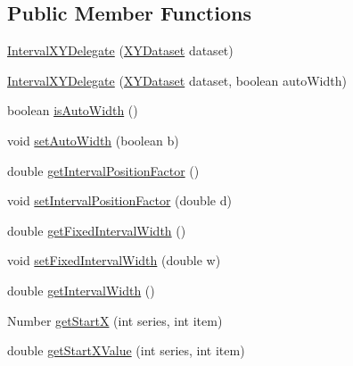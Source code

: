 \subsection*{Public Member Functions}
\begin{DoxyCompactItemize}
\item 
\mbox{\hyperlink{classorg_1_1jfree_1_1data_1_1xy_1_1_interval_x_y_delegate_a613e04f9c0fae1009e4b7c78223815d4}{Interval\+X\+Y\+Delegate}} (\mbox{\hyperlink{interfaceorg_1_1jfree_1_1data_1_1xy_1_1_x_y_dataset}{X\+Y\+Dataset}} dataset)
\item 
\mbox{\hyperlink{classorg_1_1jfree_1_1data_1_1xy_1_1_interval_x_y_delegate_aac91ba9da5d88f3a4269f9c381c42a58}{Interval\+X\+Y\+Delegate}} (\mbox{\hyperlink{interfaceorg_1_1jfree_1_1data_1_1xy_1_1_x_y_dataset}{X\+Y\+Dataset}} dataset, boolean auto\+Width)
\item 
boolean \mbox{\hyperlink{classorg_1_1jfree_1_1data_1_1xy_1_1_interval_x_y_delegate_ab44b13f9cd61ebc7b2ed8741bea98b1d}{is\+Auto\+Width}} ()
\item 
void \mbox{\hyperlink{classorg_1_1jfree_1_1data_1_1xy_1_1_interval_x_y_delegate_a0ccde42725037c83d05fa1b57e824caa}{set\+Auto\+Width}} (boolean b)
\item 
double \mbox{\hyperlink{classorg_1_1jfree_1_1data_1_1xy_1_1_interval_x_y_delegate_a36d3f28c18f3007917b94ffb61539a00}{get\+Interval\+Position\+Factor}} ()
\item 
void \mbox{\hyperlink{classorg_1_1jfree_1_1data_1_1xy_1_1_interval_x_y_delegate_a078c75387df7598aa2fe3352b5d60ddf}{set\+Interval\+Position\+Factor}} (double d)
\item 
double \mbox{\hyperlink{classorg_1_1jfree_1_1data_1_1xy_1_1_interval_x_y_delegate_afe7842c28dff0d018fa45072410c9662}{get\+Fixed\+Interval\+Width}} ()
\item 
void \mbox{\hyperlink{classorg_1_1jfree_1_1data_1_1xy_1_1_interval_x_y_delegate_a94e524aa9f513292c3349871205de0b2}{set\+Fixed\+Interval\+Width}} (double w)
\item 
double \mbox{\hyperlink{classorg_1_1jfree_1_1data_1_1xy_1_1_interval_x_y_delegate_a9cff24e223ebc66b128be0335d3b99a5}{get\+Interval\+Width}} ()
\item 
Number \mbox{\hyperlink{classorg_1_1jfree_1_1data_1_1xy_1_1_interval_x_y_delegate_a2589d4e95e8ddaa401af12826572982d}{get\+StartX}} (int series, int item)
\item 
double \mbox{\hyperlink{classorg_1_1jfree_1_1data_1_1xy_1_1_interval_x_y_delegate_aca11528343565c13c21ab6501e48a0c7}{get\+Start\+X\+Value}} (int series, int item)

\end{DoxyCompactItemize}

